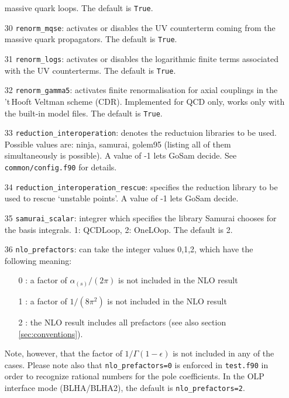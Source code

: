 \documentclass[11pt,a4paper]{refrep}
\newcommand{\gosam}{{\sc GoSam}\xspace}
\newcommand{\samurai}{{\sc Samurai}\xspace}
\newcommand{\tHV}{{'t\,Hooft Veltman}}
\begin{document}
\begin{enumerate}
massive quark loops. The default is  {\tt True}.
\item[30] \texttt{renorm\_mqse}:  activates or disables the UV counterterm coming from the 
massive quark propagators. The default is  {\tt True}.
\item[31] \texttt{renorm\_logs}: activates or disables the logarithmic finite terms  
associated with the UV counterterms.   The default is  {\tt True}.
\item[32] \texttt{renorm\_gamma5}: activates finite renormalisation for axial couplings in the 
 \tHV{} scheme (CDR).                      
Implemented for QCD only, works only with the built-in model files.    The default is  {\tt True}.
\item[33] \texttt{reduction\_interoperation}: denotes the reductuion libraries to be used. 
  Possible values are: ninja, samurai, golem95 (listing all of them simultaneously is possible). 
  A value of -1 lets \gosam{} decide.
  See {\tt common/config.f90} for details.                              
\item[34] \texttt{reduction\_interoperation\_rescue}: specifies the reduction library to be used to rescue `unstable points'. A value of -1 lets \gosam{} decide.
\item[35] \texttt{samurai\_scalar}: integrer which specifies the library \samurai{} 
chooses for the basis integrals. 1: {\sc QCDLoop}, 2: {\sc OneLOop}. The default is 2. 
\item[36] \texttt{nlo\_prefactors}:  can take the integer values 0,1,2, which have the        
    following meaning:    
    \begin{enumerate}                                          
    \item[0]: a factor of $\alpha_{(s)}/(2\pi)$ is not included in the NLO result
    \item[1]: a factor of $1/(8\pi^2)$ is not included in the NLO result       
    \item[2]: the NLO result includes all prefactors   (see also section \ref{sec:conventions}).
    \end{enumerate}                           
    Note, however, that the factor of $1/\Gamma(1-\epsilon)$ is not         
    included in any of the cases.                                   
    Please note also that {\tt nlo\_prefactors=0} is enforced in {\tt test.f90}
    in order to recognize rational numbers for the 
    pole coefficients. In the OLP interface mode (BLHA/BLHA2), the default is
    {\tt nlo\_prefactors=2}.                                 

\end{enumerate}
\end{document}
